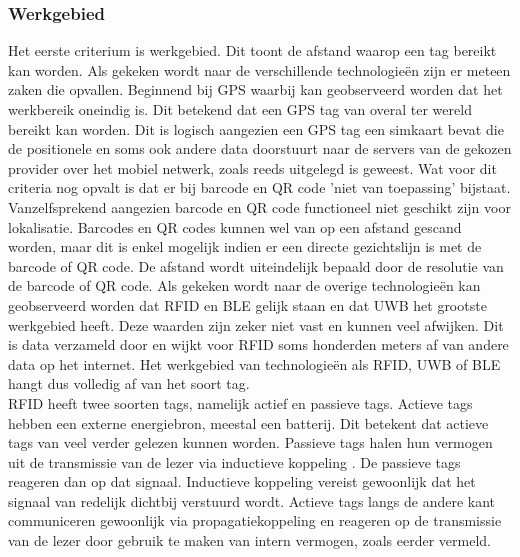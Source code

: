 \subsubsection{Werkgebied}
Het eerste criterium is werkgebied. Dit toont de afstand waarop een tag bereikt kan worden. Als gekeken wordt naar de verschillende technologieën zijn er meteen zaken die opvallen. Beginnend bij GPS waarbij kan geobserveerd worden dat het werkbereik oneindig is. Dit betekend dat een GPS tag van overal ter wereld bereikt kan worden. Dit is logisch aangezien een GPS tag een simkaart bevat die de positionele en soms ook andere data doorstuurt naar de servers van de gekozen provider over het mobiel netwerk, zoals reeds uitgelegd is geweest. Wat voor dit criteria nog opvalt is dat er bij barcode en QR code 'niet van toepassing' bijstaat. Vanzelfsprekend aangezien barcode en QR code functioneel niet geschikt zijn voor lokalisatie. Barcodes en QR codes kunnen wel van op een afstand gescand worden, maar dit is enkel mogelijk indien er een directe gezichtslijn is met de barcode of QR code. De afstand wordt uiteindelijk bepaald door de resolutie van de barcode of QR code. Als gekeken wordt naar de overige technologieën kan geobserveerd worden dat RFID en BLE gelijk staan en dat UWB het grootste werkgebied heeft. Deze waarden zijn zeker niet vast en kunnen veel afwijken. Dit is data verzameld door \textcite{Roberts2006} en wijkt voor RFID soms honderden meters af van andere data op het internet. Het werkgebied van technologieën als RFID, UWB of BLE hangt dus volledig af van het soort tag. \\

RFID heeft twee soorten tags, namelijk actief en passieve tags. Actieve tags hebben een externe energiebron, meestal een batterij. Dit betekent dat actieve tags van veel verder gelezen kunnen worden. Passieve tags halen hun vermogen uit de transmissie van de lezer via inductieve koppeling \autocite{Roberts2006}. De passieve tags reageren dan op dat signaal. Inductieve koppeling vereist gewoonlijk dat het signaal van redelijk dichtbij verstuurd wordt. Actieve tags langs de andere kant communiceren gewoonlijk via propagatiekoppeling en reageren op de transmissie van de lezer door gebruik te maken van intern vermogen, zoals eerder vermeld.\\

